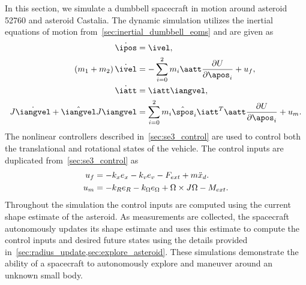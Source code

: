 \documentclass[letterpaper, paper,11pt]{AAS}		%
\begin{document}
In this section, we simulate a dumbbell spacecraft in motion around asteroid \num{52760} and asteroid Castalia.
The dynamic simulation utilizes the inertial equations of motion from~\cref{sec:inertial_dumbbell_eoms} and are given as
\begin{align*}
    \dot{\ipos} &= \ivel, \\
    \parenth{m_1 + m_2} \dot{\ivel} &= - \sum_{i=0}^2 m_i \aatt \deriv{U}{\apos_i} + u_f, \\
    \dot{\iatt} &= \iatt \iangvel, \\
    J \dot{\iangvel} + \hat{\iangvel} J \iangvel &= \sum_{i=0}^2 m_i \hat{\spos}_i \iatt^T \aatt \deriv{U}{\apos_i} + u_m. 
\end{align*}
The nonlinear controllers described in~\cref{sec:se3_control} are used to control both the translational and rotational states of the vehicle.
The control inputs are duplicated from~\cref{sec:se3_control} as
\begin{align*}
    u_f &= -k_x e_x - k_v e_v - F_{ext} + m \ddot{x}_d . \\
    u_m &= -k_R e_R - k_\Omega e_\Omega + \Omega \times J \Omega - M_{ext}.
\end{align*}
Throughout the simulation the control inputs are computed using the current shape estimate of the asteroid. 
As measurements are collected, the spacecraft autonomously updates its shape estimate and uses this estimate to compute the control inputs and desired future states using the details provided in~\cref{sec:radius_update,sec:explore_asteroid}.
These simulations demonstrate the ability of a spacecraft to autonomously explore and maneuver around an unknown small body.
\end{document}
